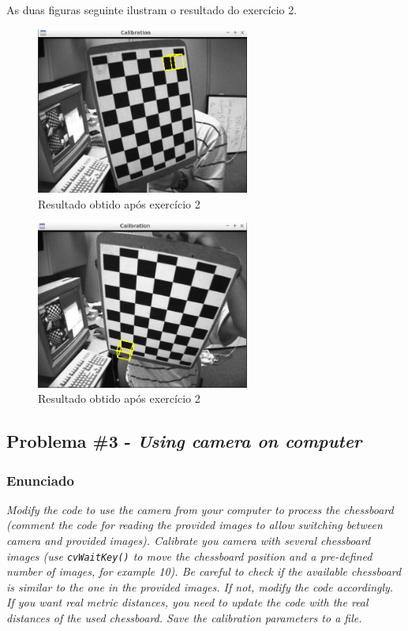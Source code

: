 \documentclass[portuguese, times, mirror]{revdetua}
\begin{document}
As duas figuras seguinte ilustram o resultado do exercício 2.

\begin{figure}[ht!]
\centering
\includegraphics[width=70mm]{img/ex2_r.png}
\caption{Resultado obtido após exercício 2}
\end{figure}

\begin{figure}[ht!]
\centering
\includegraphics[width=70mm]{img/ex2_r2.png}
\caption{Resultado obtido após exercício 2}
\end{figure}



\subsection{Problema \#3 - \textit{Using camera on computer}}

\subsubsection{Enunciado}
\textit{Modify the code to use the camera from your computer to process the chessboard (comment the code for reading the provided images to allow switching between camera and provided images). Calibrate you camera with several chessboard images (use \texttt{cvWaitKey()} to move the chessboard position and a pre-defined number of images, for example 10). Be careful to check if the available chessboard is
similar to the one in the provided images. If not, modify the code accordingly. If you want real metric distances, you need to update the code with the real distances of the used chessboard. Save the calibration parameters to a file.}
\end{document}
